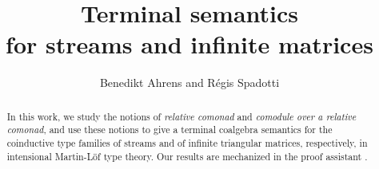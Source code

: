 \documentclass[envcountsame]{llncs}
\begin{document}
\title{Terminal semantics\\for streams and infinite matrices}

\author{Benedikt Ahrens and R\'egis Spadotti}


\newcommand{\fat}[1]{\textbf{#1}}





\maketitle


\begin{abstract}


 In this work, we study the notions of \emph{relative comonad} and \emph{comodule over a relative comonad}, and  
 use these notions to give a terminal coalgebra semantics for the coinductive type families of streams and
 of infinite triangular matrices, respectively, in intensional Martin-L\"of type theory.
 Our results are mechanized in the proof assistant \coq.
 
    
  
  

%   
  
  
  \end{abstract}
\end{document}
